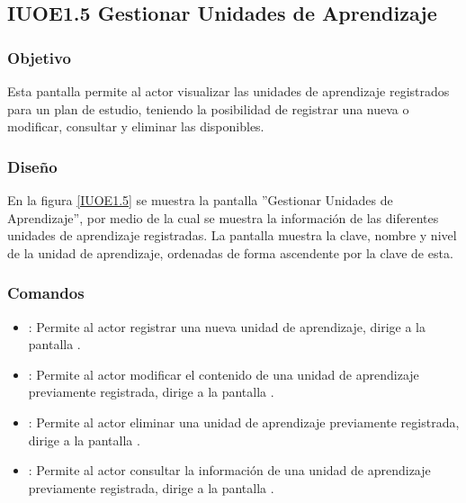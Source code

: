 \subsection{IUOE1.5 Gestionar Unidades de Aprendizaje}

\subsubsection{Objetivo}
	
	Esta pantalla permite al actor visualizar las unidades de aprendizaje registrados para un plan de estudio, teniendo la posibilidad de registrar una nueva o modificar, consultar y eliminar las disponibles.

\subsubsection{Diseño}

    En la figura \ref{IUOE1.5} se muestra la pantalla ''Gestionar Unidades de Aprendizaje'', por medio de la cual se muestra la información de las diferentes unidades de aprendizaje registradas. La pantalla muestra la clave, nombre y nivel de la unidad de aprendizaje, ordenadas de forma ascendente por la clave de esta.
 

\subsubsection{Comandos}
    \begin{itemize}
	\item \btnRegistrar: Permite al actor registrar una nueva unidad de aprendizaje, dirige a la pantalla .
	
	\item {}: Permite al actor modificar el contenido de una unidad de aprendizaje previamente registrada, dirige a la pantalla .
	
	\item {}: Permite al actor eliminar una unidad de aprendizaje previamente registrada, dirige a la pantalla .
	
	\item {}: Permite al actor consultar la información de una unidad de aprendizaje previamente registrada, dirige a la pantalla .
    \end{itemize}
